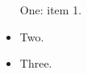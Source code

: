\documentclass{article}
\begin{document}
\begin{itemize}
\item [One:] item 1.
\item Two.
\item Three.
\end{itemize}
\end{document}
